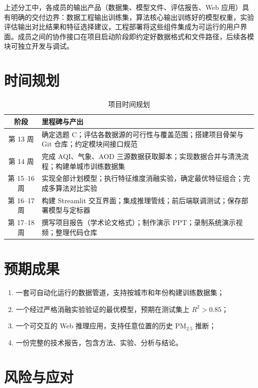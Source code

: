 \documentclass[UTF8,zihao=-4,a4paper]{ctexart}
\newcommand{\pmfine}{PM$_{2.5}$}
\newcommand{\aodd}{AOD}
\begin{document}
上述分工中，各成员的输出产品（数据集、模型文件、评估报告、Web 应用）具有明确的交付边界：数据工程输出训练集，算法核心输出训练好的模型权重，实验评估输出对比结果和特征选择建议，工程部署将这些组件集成为可运行的用户界面。成员之间的协作接口在项目启动阶段即约定好数据格式和文件路径，后续各模块可独立开发与调试。

\section{时间规划}

\begin{table}[H]
  \centering
  \caption{项目时间规划}
  \begin{tabularx}{\textwidth}{cX}
    \toprule
    阶段 & 里程碑与产出 \\
    \midrule
    第 13 周 & 确定选题 C；评估各数据源的可行性与覆盖范围；搭建项目骨架与 Git 仓库；约定模块间接口规范 \\
    第 14 周 & 完成 AQI、气象、\aodd{} 三源数据获取脚本；实现数据合并与清洗流程；构建单城市训练数据集 \\
    第 15--16 周 & 实现全部计划模型；执行特征维度消融实验，确定最优特征组合；完成多算法对比实验 \\
    第 16--17 周 & 构建 Streamlit 交互界面；集成推理管线；前后端联调测试；保存部署模型与定标器 \\
    第 17--18 周 & 撰写项目报告（学术论文格式）；制作演示 PPT；录制系统演示视频；整理代码仓库 \\
    \bottomrule
  \end{tabularx}
\end{table}

\section{预期成果}

\begin{enumerate}
  \item 一套可自动化运行的数据管道，支持按城市和年份构建训练数据集；
  \item 一个经过严格消融实验验证的最优模型，预期在测试集上 $R^2 > 0.85$；
  \item 一个可交互的 Web 推理应用，支持任意位置的历史 \pmfine{} 推断；
  \item 一份完整的技术报告，包含方法、实验、分析与结论。
\end{enumerate}

\section{风险与应对}
\end{document}

